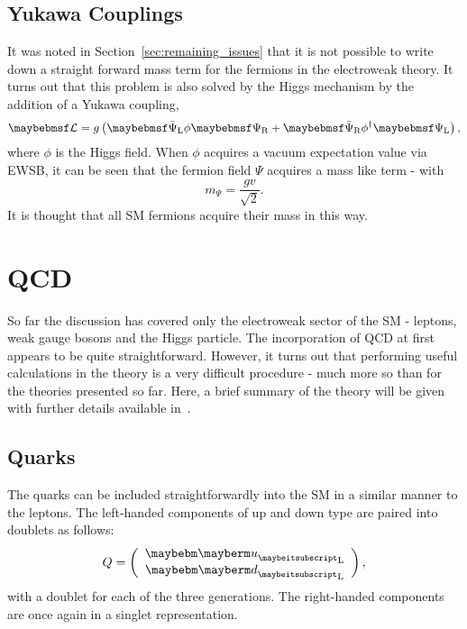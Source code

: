 \subsection{Yukawa Couplings}
\label{sec:theory_yukawa}
It was noted in Section~\ref{sec:remaining_issues} that it is not possible to
write down a straight forward mass term for the fermions in the electroweak
theory. It turns out that this problem is also solved by the Higgs mechanism by
the addition of a Yukawa coupling,
\begin{equation*}
\lagrangiand = g \left(\APsiL \phi \PsiR + \APsiR\phi^{\dagger}\PsiL\right),
\end{equation*}
where $\phi$ is the Higgs field. When $\phi$ acquires a vacuum expectation value
via \ac{EWSB}, it can be seen that the fermion field $\Psi$ acquires a mass like
term - with
\begin{equation*}
m_{\Psi} = \frac{gv}{\sqrt{2}}.
\end{equation*}
It is thought that all \ac{SM} fermions acquire their mass in this way.

\section{\acl{QCD}}
So far the discussion has covered only the electroweak sector of the \ac{SM} -
leptons, weak gauge bosons and the Higgs particle. The incorporation of
\acl{QCD} at first appears to be quite straightforward. However, it turns out
that performing useful calculations in the theory is a very difficult procedure
- much more so than for the theories presented so far. Here, a brief summary of
the theory will be given with further details available in~\cite{pink_book}.

\subsection{Quarks}
The quarks can be included straightforwardly into the \ac{SM} in a similar
manner to the leptons. The left-handed components of up and down type are paired
into doublets as follows:
\begin{equation*}
Q=\left(\begin{array}{c}\Pup_{\textrm{L}} \\ \Pdown_{\textrm{L}}\end{array}\right),
\end{equation*}
with a doublet for each of the three generations. The right-handed components
are once again in a singlet representation.

